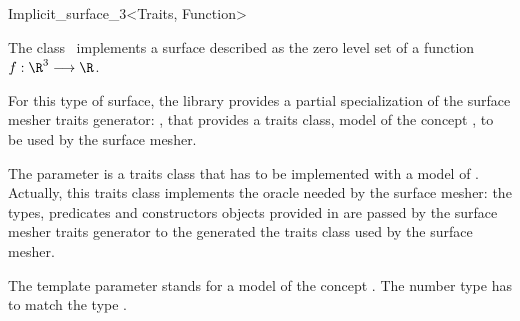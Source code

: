 

\begin{ccRefClass}{Implicit_surface_3<Traits, Function>}


\ccDefinition
  
The class \ccRefName\  implements a surface described 
as the zero level
set  of a function \begin{math}f : \R^3 \longrightarrow \R\end{math}.


For this type of surface, the library provides a partial specialization
of the  surface mesher traits generator:
,
that provides a traits class, model of the concept
,
to be used by the surface mesher.


The parameter  is a traits class 
that has to be implemented with a model of 
.
Actually, this traits class implements the oracle needed by the
surface mesher:
the types, predicates and constructors objects provided
in  are
passed by the surface mesher traits generator
to the generated the traits class
used by the surface mesher.

The template parameter   stands for a model
of the concept .
The number type  has to match
the type .


\ccCreation
{}


\end{ccRefClass}
